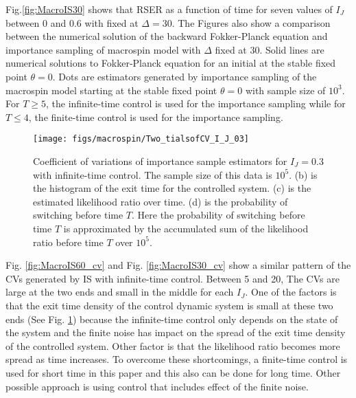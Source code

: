 \documentclass[journal,transmag]{IEEEtran}
\begin{document}
Fig.\ref{fig:MacroIS30} shows that RSER as a function of time for seven values of $I_J$ between $0$ and $ 0.6$ with fixed at $\Delta = 30$.  The Figures also show a comparison between the numerical solution of the backward Fokker-Planck equation and importance sampling of macrospin model with $\Delta$ fixed at $30$.
Solid lines are numerical solutions to Fokker-Planck equation for an initial at the stable fixed point $\theta = 0$. Dots are estimators generated by importance sampling of the macrospin model starting at the stable fixed point $\theta = 0$ with sample size of $10^3$. For $T \ge 5$, the infinite-time control is used for the importance sampling while for $T \le 4$, the finite-time control is used for the importance sampling.
\begin{figure}[h]
   \centering
         \texttt{[image: figs/macrospin/Two\_tialsofCV\_I\_J\_03]}
   \caption{Coefficient of variations of importance sample estimators for $I_J = 0.3$ with infinite-time control. The sample size of this data is $10^5$. (b) is the histogram of the exit time for the controlled system. (c) is the estimated likelihood ratio over time. (d) is the probability of switching before time $T$. Here the probability of switching before time $T$ is approximated by the accumulated sum of the likelihood ratio before time $T$ over $10^5$.}
   \label{fig:Two_tialsofCV_I_J_03}
\end{figure}

Fig. \ref{fig:MacroIS60_cv} and  Fig. \ref{fig:MacroIS30_cv} show a similar pattern of the CVs generated by IS with infinite-time control. Between 5 and 20, The CVs are large at the two ends and small in the middle for each $I_J$. One of the factors is that the exit time density of the control dynamic system is small at these two ends (See Fig. \ref{fig:Two_tialsofCV_I_J_03}) because the infinite-time control only depends on the state of the system and the finite noise has impact on the spread of the exit time density of the controlled system. Other factor is that the likelihood ratio becomes more spread as time increases.  To overcome these shortcomings, a finite-time control is used for short time in this paper and this also can be done for long time. Other possible approach is using control that includes effect of the finite noise.
\end{document}
